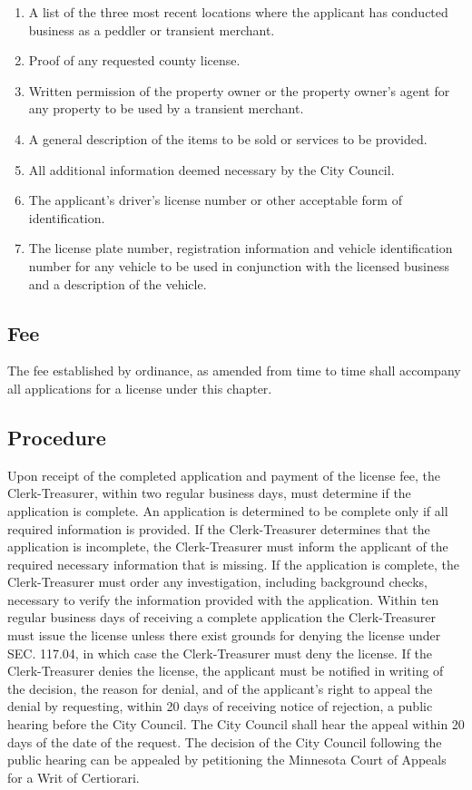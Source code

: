 \begin{enumerate}[{\indent}1)]
    \item A list of the three most recent locations where the applicant has conducted business as a peddler or transient merchant.
    \item Proof of any requested county license.
    \item Written permission of the property owner or the property owner’s agent for any property to be used by a transient merchant.
    \item A general description of the items to be sold or services to be provided.
    \item All additional information deemed necessary by the City Council.
    \item The applicant’s driver’s license number or other acceptable form of identification.
    \item The license plate number, registration information and vehicle identification number for any vehicle to be used in conjunction with the licensed business and a description of the vehicle.
\end{enumerate}
\subsection{Fee}
The fee established by ordinance, as amended from time to time shall accompany all applications for a license under this chapter.
\subsection{Procedure}
Upon receipt of the completed application and payment of the license fee, the Clerk-Treasurer, within two regular business days, must determine if the application is complete.  An application is determined to be complete only if all required information is provided.  If the Clerk-Treasurer determines that the application is incomplete, the Clerk-Treasurer must inform the applicant of the required necessary information that is missing. If the application is complete, the Clerk-Treasurer must order any investigation, including background checks, necessary to verify the information provided with the application.  Within ten regular business days of receiving a complete application the Clerk-Treasurer must issue the license unless there exist grounds for denying the license under SEC. 117.04, in which case the Clerk-Treasurer must deny the license. If the Clerk-Treasurer denies the license, the applicant must be notified in writing of the decision, the reason for denial, and of the applicant’s right to appeal the denial by requesting, within 20 days of receiving notice of rejection, a public hearing before the City Council. The City Council shall hear the appeal within 20 days of the date of the request. The decision of the City Council following the public hearing can be appealed by petitioning the Minnesota Court of Appeals for a Writ of Certiorari.
